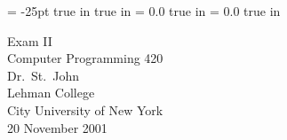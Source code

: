 \pagestyle{empty}
\topmargin= -25pt
 true in
 true in
\oddsidemargin = 0.0 true in
\evensidemargin = 0.0 true in
\newcommand{\ul}{\underline}
\newcommand{\spa}{\hspace{.25in}}


{\large
\begin{center}
    Exam II\\
    Computer Programming 420 \\
    Dr.~St.~John\\ 
    Lehman College\\
    City University of New York\\ 
    20 November 2001
\end{center}
}


